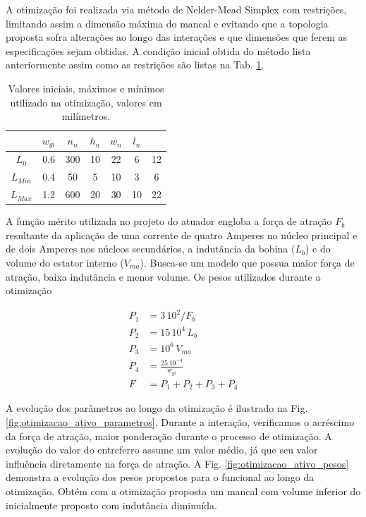 A otimização foi realizada via método de Nelder-Mead Simplex com restrições, limitando assim a dimensão máxima do mancal e evitando que a topologia proposta sofra alterações ao longo das interações e que dimensões que ferem as especificações sejam obtidas. A condição inicial obtida do método lista anteriormente assim como as restrições são listas na Tab. \ref{tab:ativo:restrições}.

\begin{table}[ht!]
	\centering
	\begin{tabular}{c c c c c c c}
					 & $w_{gi}$ & $n_n$ & $h_n$ & $w_n$ &  $l_n$   \\ \hline \hline
		$L_{0}$  &  0.6 & 300  &   10 &  22 & 6  &   12 \\
		$L_{Min}$&  0.4 & 50   &   5  &  10 & 3  &   6	\\
		$L_{Max}$ & 1.2 & 600  &   20 &  30 & 10 &   22
	\end{tabular} 
	\caption{Valores iniciais, máximos e mínimos utilizado na otimização, valores em milímetros.}
	\label{tab:ativo:restrições} 
\end{table}

A função mérito utilizada no projeto do atuador engloba a força de atração $F_b$ resultante da aplicação de uma corrente de quatro Amperes no núcleo principal e de dois Amperes nos núcleos secundários, a indutância da bobina ($L_b$) e do volume do estator interno ($V_{ma}$). Busca-se um modelo que possua maior força de atração, baixa indutância e menor volume. Os pesos utilizados durante a otimização 

\begin{align}
	P_1 &= 3 \, 10^2/ F_b \\
	P_2 &= 15 \, 10^4 \, L_b \\
	P_3 &= 10^6 \, V_{ma} \\
	P_4 &= \frac{25 \, 10^{-4}}{w_{gi}}				\\
	F   &= P_1 + P_2 + P_3 + P_4
\end{align}

A evolução dos parâmetros ao longo da otimização é ilustrado na Fig. \ref{fig:otimizacao_ativo_parametros}. Durante a interação, verificamos o acréscimo da força de atração,  maior ponderação durante o processo de otimização.  A evolução do valor do entreferro assume um valor médio, já que seu valor influência diretamente na força de atração. A Fig. \ref{fig:otimizacao_ativo_pesos} demonstra a evolução dos pesos propostos para o funcional ao longo da otimização. Obtém com a otimização proposta um mancal com volume inferior do inicialmente proposto com indutância diminuída.

